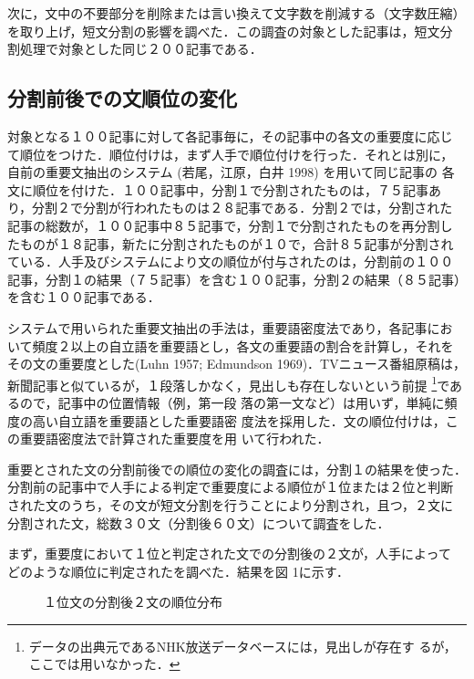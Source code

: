 次に，文中の不要部分を削除または言い換えて文字数を削減する（文字数圧縮）
を取り上げ，短文分割の影響を調べた．この調査の対象とした記事は，短文分
割処理で対象とした同じ２００記事である．

\subsection{分割前後での文順位の変化}
対象となる１００記事に対して各記事毎に，その記事中の各文の重要度に応じ
て順位をつけた．順位付けは，まず人手で順位付けを行った．それとは別に，
自前の重要文抽出のシステム (若尾，江原，白井 1998) を用いて同じ記事の
各文に順位を付けた．１００記事中，分割１で分割されたものは，７５記事あ
り，分割２で分割が行われたものは２８記事である．分割２では，分割された
記事の総数が，１００記事中８５記事で，分割１で分割されたものを再分割し
たものが１８記事，新たに分割されたものが１０で，合計８５記事が分割され
ている．人手及びシステムにより文の順位が付与されたのは，分割前の１００
記事，分割１の結果（７５記事）を含む１００記事，分割２の結果（８５記事）
を含む１００記事である．

システムで用いられた重要文抽出の手法は，重要語密度法であり，各記事にお
いて頻度２以上の自立語を重要語とし，各文の重要語の割合を計算し，それを
その文の重要度とした(Luhn 1957; Edmundson 1969)．TVニュース番組原稿は，
新聞記事と似ているが，１段落しかなく，見出しも存在しないという前提
\footnote{データの出典元であるNHK放送データベースには，見出しが存在す
るが，ここでは用いなかった．}であるので，記事中の位置情報（例，第一段
落の第一文など）は用いず，単純に頻度の高い自立語を重要語とした重要語密
度法を採用した．文の順位付けは，この重要語密度法で計算された重要度を用
いて行われた．

重要とされた文の分割前後での順位の変化の調査には，分割１の結果を使った．
分割前の記事中で人手による判定で重要度による順位が１位または２位と判断
された文のうち，その文が短文分割を行うことにより分割され，且つ，２文に
分割された文，総数３０文（分割後６０文）について調査をした．

まず，重要度において１位と判定された文での分割後の２文が，人手によって
どのような順位に判定されたを調べた．結果を図 1に示す．

\begin{figure}[h]
\vspace{-4mm}
\begin{center}
\mbox{}
\end{center}\vspace{-1mm}
\caption{１位文の分割後２文の順位分布}
\end{figure}

